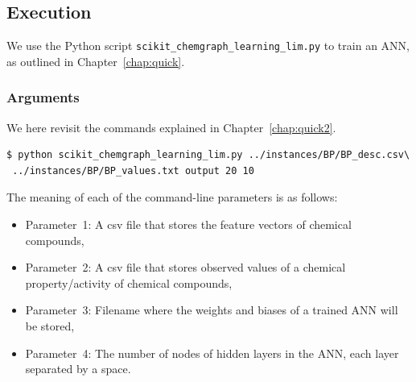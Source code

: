 \documentclass[11pt,titlepage,dvipdfmx,twoside]{book}
\newcommand{\chapref}[1]{Chapter~\ref{chap:#1}}
\begin{document}
  
\subsection{Execution}

We use the Python script {\tt scikit\_chemgraph\_learning\_lim.py}
to train an ANN, as outlined in \chapref{quick}.


\subsubsection{Arguments}
We here revisit the commands 
explained in \chapref{quick2}.
\begin{oframed}
  {\small  
\begin{verbatim}
$ python scikit_chemgraph_learning_lim.py ../instances/BP/BP_desc.csv\
 ../instances/BP/BP_values.txt output 20 10
\end{verbatim}
}
\end{oframed}
The meaning of each of the command-line parameters is as follows:
\begin{itemize}
\item Parameter~1: 
  A csv file that stores the feature vectors of chemical compounds,
  
\item Parameter~2: 
  A csv file that stores observed values of a chemical property/activity of chemical compounds,
  
\item Parameter~3: 
Filename where the weights and biases of a trained ANN will be stored,

\item Parameter~4: 
The number of nodes of hidden layers in the ANN, each layer separated by a space.
\end{itemize}
\end{document}
